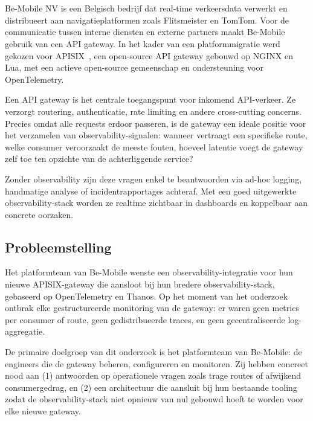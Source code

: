 
\chapter{}%
\label{ch:inleiding}

Be-Mobile NV is een Belgisch bedrijf dat real-time verkeersdata verwerkt en distribueert aan navigatieplatformen zoals Flitsmeister en TomTom. Voor de communicatie tussen interne diensten en externe partners maakt Be-Mobile gebruik van een API gateway. In het kader van een platformmigratie werd gekozen voor APISIX~\autocite{APISIX2024}, een open-source API gateway gebouwd op NGINX en Lua, met een actieve open-source gemeenschap en ondersteuning voor OpenTelemetry.

Een API gateway is het centrale toegangspunt voor inkomend API-verkeer. Ze verzorgt routering, authenticatie, rate limiting en andere cross-cutting concerns. Precies omdat alle requests erdoor passeren, is de gateway een ideale positie voor het verzamelen van observability-signalen: wanneer vertraagt een specifieke route, welke consumer veroorzaakt de meeste fouten, hoeveel latentie voegt de gateway zelf toe ten opzichte van de achterliggende service?

Zonder observability zijn deze vragen enkel te beantwoorden via ad-hoc logging, handmatige analyse of incidentrapportages achteraf. Met een goed uitgewerkte observability-stack worden ze realtime zichtbaar in dashboards en koppelbaar aan concrete oorzaken.

\section{Probleemstelling}%
\label{sec:probleemstelling}

Het platformteam van Be-Mobile wenste een observability-integratie voor hun nieuwe APISIX-gateway die aansloot bij hun bredere observability-stack, gebaseerd op OpenTelemetry en Thanos. Op het moment van het onderzoek ontbrak elke gestructureerde monitoring van de gateway: er waren geen metrics per consumer of route, geen gedistribueerde traces, en geen gecentraliseerde log-aggregatie.

De primaire doelgroep van dit onderzoek is het platformteam van Be-Mobile: de engineers die de gateway beheren, configureren en monitoren. Zij hebben concreet nood aan (1) antwoorden op operationele vragen zoals trage routes of afwijkend consumergedrag, en (2) een architectuur die aansluit bij hun bestaande tooling zodat de observability-stack niet opnieuw van nul gebouwd hoeft te worden voor elke nieuwe gateway.

